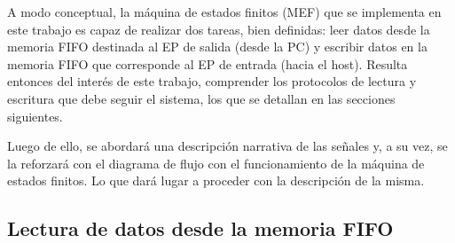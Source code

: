 
A modo conceptual, la máquina de estados finitos (MEF) que se implementa en este trabajo es capaz de realizar dos tareas, bien definidas: leer datos desde la memoria FIFO destinada al EP de salida (desde la PC) y escribir datos en la memoria FIFO que corresponde al EP de entrada (hacia el host). Resulta entonces del interés de este trabajo, comprender los protocolos de lectura y escritura que debe seguir el sistema, los que se detallan en las secciones siguientes.

Luego de ello, se abordará una descripción narrativa de las señales y, a su vez, se la reforzará con el diagrama de flujo con el funcionamiento de la máquina de estados finitos. Lo que dará lugar a proceder con la descripción de la misma.

\subsection{Lectura de datos desde la memoria FIFO}


